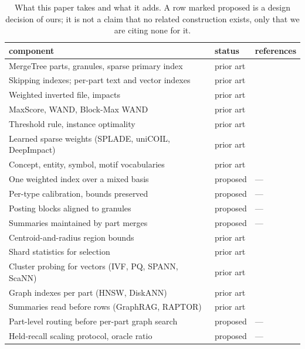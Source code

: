 \begin{table}[h]
\centering
\footnotesize
\begin{tabular}{@{}p{}ll@{}}
\toprule
component & status & references \\
\midrule
MergeTree parts, granules, sparse primary index & prior art & \cite{schulze2024clickhouse,clickhousedocs} \\
Skipping indexes; per-part text and vector indexes & prior art & \cite{clickhousedocs,moerkotte1998sma} \\
Weighted inverted file, impacts & prior art & \cite{zobel2006inverted,anh2002impact} \\
MaxScore, WAND, Block-Max WAND & prior art & \cite{turtle1995maxscore,broder2003wand,ding2011bmw} \\
Threshold rule, instance optimality & prior art & \cite{fagin2003ta} \\
Learned sparse weights (SPLADE, uniCOIL, DeepImpact) & prior art & \cite{formal2021splade,mallia2021deepimpact,lin2021unicoil} \\
Concept, entity, symbol, motif vocabularies & prior art & \cite{gabrilovich2007esa,xiong2017duet,cox2012trigram,milo2002motifs} \\
One weighted index over a mixed basis & proposed & --- \\
Per-type calibration, bounds preserved & proposed & --- \\
Posting blocks aligned to granules & proposed & --- \\
Summaries maintained by part merges & proposed & --- \\
Centroid-and-radius region bounds & prior art & \cite{fukunaga1975branch,ciaccia1997mtree} \\
Shard statistics for selection & prior art & \cite{callan1995cori,si2003redde,aly2013taily} \\
Cluster probing for vectors (IVF, PQ, SPANN, ScaNN) & prior art & \cite{jegou2011pq,chen2021spann,guo2020scann} \\
Graph indexes per part (HNSW, DiskANN) & prior art & \cite{malkov2020hnsw,subramanya2019diskann} \\
Summaries read before rows (GraphRAG, RAPTOR) & prior art & \cite{edge2024graphrag,sarthi2024raptor} \\
Part-level routing before per-part graph search & proposed & --- \\
Held-recall scaling protocol, oracle ratio & proposed & --- \\
\bottomrule
\end{tabular}
\caption{What this paper takes and what it adds. A row marked proposed is a
design decision of ours; it is not a claim that no related construction
exists, only that we are citing none for it.}
\label{tab:status}
\end{table}
